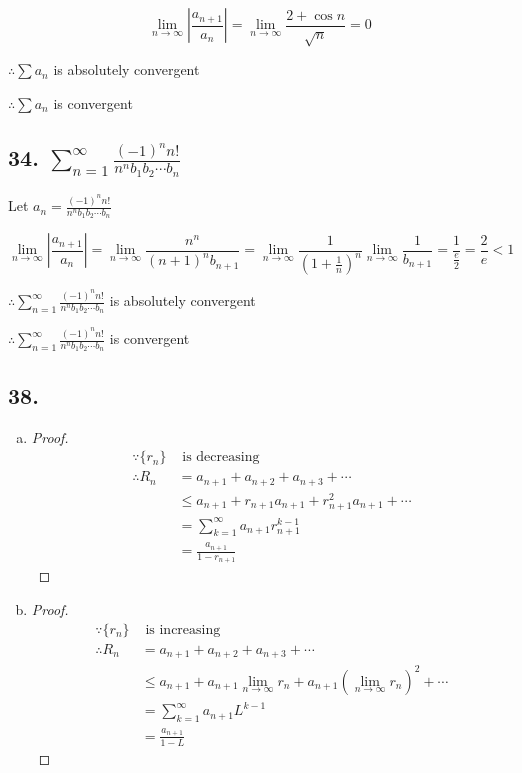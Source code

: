 \documentclass{article}
\begin{document}
    $$\lim_{n\to\infty}|\frac{a_{n+1}}{a_n}| = \lim_{n\to\infty}\frac{2 + \cos n}{\sqrt n} = 0$$

    $\therefore \sum a_n$ is absolutely convergent

    $\therefore \sum a_n$ is convergent

    \subsection*{34. $\sum_{n=1}^\infty \frac{(-1)^n n!}{n^n b_1 b_2 \cdots b_n}$}

    Let $a_n = \frac{(-1)^n n!}{n^n b_1 b_2 \cdots b_n}$

    $$\lim_{n\to\infty}|\frac{a_{n+1}}{a_n}| = \lim_{n\to\infty}\frac{n^n}{(n+1)^{n} b_{n+1}} = \lim_{n\to\infty}\frac{1}{(1 + \frac 1 n)^n} \lim_{n\to\infty}\frac{1}{b_{n+1}} = \frac{1}{\frac{e}{2}} = \frac 2 e < 1$$

    $\therefore\sum_{n=1}^\infty \frac{(-1)^n n!}{n^n b_1 b_2 \cdots b_n}$ is absolutely convergent

    $\therefore\sum_{n=1}^\infty \frac{(-1)^n n!}{n^n b_1 b_2 \cdots b_n}$ is convergent

    \subsection*{38. }

    \begin{enumerate}[(a)]
        \item \begin{proof}
            
            $$\begin{aligned}
                \because\{r_n\}& \textrm{ is decreasing} \\
                \therefore R_n &= a_{n+1} + a_{n+2} + a_{n+3} + \cdots \\
                &\leq a_{n+1} + r_{n+1}a_{n+1} + r_{n+1}^2a_{n+1} + \cdots \\
                &= \sum_{k=1}^\infty a_{n+1}r_{n+1}^{k-1} \\
                &= \frac{a_{n+1}}{1-r_{n+1}}
            \end{aligned}$$

        \end{proof}
        \item \begin{proof}
            
            $$\begin{aligned}
                \because \{r_n\}& \textrm{ is increasing} \\
                \therefore R_n &= a_{n+1} + a_{n+2} + a_{n+3} + \cdots \\
                &\leq a_{n+1} + a_{n+1}\lim_{n\to\infty}r_n + a_{n+1}(\lim_{n\to\infty}r_n)^2 + \cdots \\
                &= \sum_{k=1}^\infty a_{n+1}L^{k-1} \\
                &= \frac{a_{n+1}}{1-L}
            \end{aligned}$$
        \end{proof}
    \end{enumerate}
\end{document}

